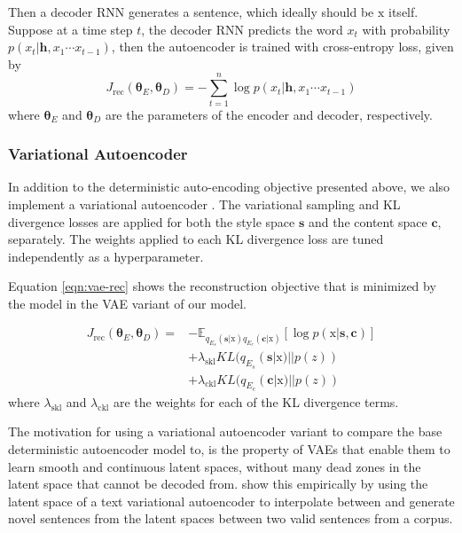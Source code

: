 \documentclass[11pt,a4paper]{article}
\newcommand{\rmx}{\mathrm x}
\newcommand{\loss}[1]{J_\text{#1}}
\begin{document}
Then a decoder RNN generates a sentence, which ideally should be $\rmx$ itself. Suppose at a time step $t$, the decoder RNN predicts the word $x_t$ with probability $p(x_t|\bm h, x_1\cdots x_{t-1})$, then the autoencoder is trained with cross-entropy loss, given by
\begin{equation}
	\loss{rec}(\bm\theta_E,\bm\theta_D)= -\sum_{t=1}^n \log p(x_t|\bm h, x_1\cdots x_{t-1})
\end{equation}
where $\bm\theta_E$ and $\bm\theta_D$ are the parameters of the encoder and decoder, respectively.

\subsubsection{Variational Autoencoder}

In addition to the deterministic auto-encoding objective presented above, we also implement a variational autoencoder \cite{kingma2013auto}. The variational sampling and KL divergence losses are applied for both the style space $\bm s$ and the content space $\bm c$, separately. The weights applied to each KL divergence loss are tuned independently as a hyperparameter.

Equation \ref{eqn:vae-rec} shows the reconstruction objective that is minimized by the model in the VAE variant of our model.

\begin{align} \label{eqn:vae-rec}
	\loss{rec}(\bm\theta_E, \bm\theta_D) = \nonumber
	 & - \mathbb{E}_{q_{E_s}(\bm s|\rmx) q_{E_c}(\bm c|\rmx)} [\log p(\rmx|\bm s, \bm c)] \nonumber \\
	 & + \lambda_{\text{skl}} KL(q_{E_s}(\bm s|\rmx)||p(z)) \nonumber                               \\
	 & + \lambda_{\text{ckl}} KL(q_{E_c}(\bm c|\rmx)||p(z))
\end{align}
where $\lambda_{\text{skl}}$ and $\lambda_{\text{ckl}}$ are the weights for each of the KL divergence terms.

The motivation for using a variational autoencoder variant to compare the base deterministic autoencoder model to, is the property of VAEs that enable them to learn smooth and continuous latent spaces, without many dead zones in the latent space that cannot be decoded from. \cite{bowman2016generating} show this empirically by using the latent space of a text variational autoencoder to interpolate between and generate novel sentences from the latent spaces between two valid sentences from a corpus.
\end{document}
